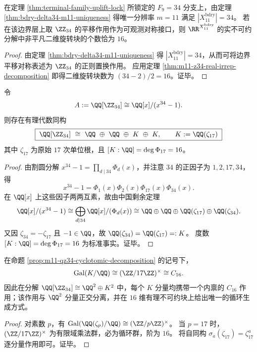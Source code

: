 \begin{corollary}\label{cor:m11-z34-sixteen-rotation-planes-from-family-lock}
在定理 \ref{thm:terminal-family-uplift-lock} 所锁定的 \(F_9=34\) 分支上，由定理 \ref{thm:bdry-delta34-m11-uniqueness} 得唯一分辨率 \(m=11\) 满足 \(|X_{11}^{\mathrm{bdry}}|=34\)。
若在该边界层上取 \(\ZZ_{34}\) 的平移作用作为可观测对称接口，则 \(\RR^{X_{11}^{\mathrm{bdry}}}\) 的实不可约分解中非平凡二维旋转块的个数恰为 \(16\)。
\end{corollary}
\begin{proof}
由定理 \ref{thm:bdry-delta34-m11-uniqueness} 得 \(|X_{11}^{\mathrm{bdry}}|=34\)，从而可将边界平移对称表述为 \(\ZZ_{34}\) 的正则置换作用。
应用定理 \ref{thm:m11-z34-real-irrep-decomposition} 即得二维旋转块数为 \((34-2)/2=16\)。证毕。
\end{proof}

\begin{proposition}\label{prop:m11-qz34-cyclotomic-decomposition}
令
\[
A:=\QQ[\ZZ_{34}]\cong \QQ[x]/(x^{34}-1).
\]
则存在有理代数同构
\begin{equation}\label{eq:m11-qz34-cyclotomic-decomposition}
\boxed{\;
\QQ[\ZZ_{34}]
\ \cong\
\QQ\ \oplus\ \QQ\ \oplus\ K\ \oplus\ K,
\qquad
K:=\QQ(\zeta_{17})\;}
\end{equation}
其中 \(\zeta_{17}\) 为原始 \(17\) 次单位根，且 \([K:\QQ]=\deg\Phi_{17}=16\)。
\end{proposition}
\begin{proof}
由割圆分解 \(x^{34}-1=\prod_{d\mid 34}\Phi_d(x)\)，并注意 \(34\) 的正因子为 \(1,2,17,34\)，得
\[
x^{34}-1=\Phi_1(x)\Phi_2(x)\Phi_{17}(x)\Phi_{34}(x).
\]
在 \(\QQ[x]\) 上这些因子两两互素，故由中国剩余定理
\[
\QQ[x]/(x^{34}-1)\cong \bigoplus_{d\mid 34}\QQ[x]/(\Phi_d(x))
\cong \QQ\oplus \QQ\oplus \QQ(\zeta_{17})\oplus \QQ(\zeta_{34}).
\]
又因 \(\zeta_{34}=-\zeta_{17}\) 且 \(-1\in\QQ\)，故 \(\QQ(\zeta_{34})=\QQ(\zeta_{17})=:K\)。
度数 \([K:\QQ]=\deg\Phi_{17}=16\) 为标准事实。证毕。
\end{proof}

\begin{corollary}\label{cor:m11-qz34-galois-c16}
在命题 \ref{prop:m11-qz34-cyclotomic-decomposition} 的记号下，
\[
\mathrm{Gal}(K/\QQ)\cong (\ZZ/17\ZZ)^\times\cong C_{16}.
\]
因此在分解 \(\QQ[\ZZ_{34}]\cong \QQ^2\oplus K^2\) 中，每个 \(K\) 分量均携带一个内禀的 \(C_{16}\) 作用；该作用与 \(\QQ^2\) 分量正交分离，并在 \(16\) 维有理不可约块上给出唯一的循环生成方式。
\end{corollary}
\begin{proof}
对素数 \(p\)，有 \(\mathrm{Gal}(\QQ(\zeta_p)/\QQ)\cong (\ZZ/p\ZZ)^\times\)。
当 \(p=17\) 时，\((\ZZ/17\ZZ)^\times\) 为有限域乘法群，必为循环群，阶为 \(16\)。
将自同构 \(\sigma_a(\zeta_{17})=\zeta_{17}^a\) 逐分量作用即可。证毕。
\end{proof}

